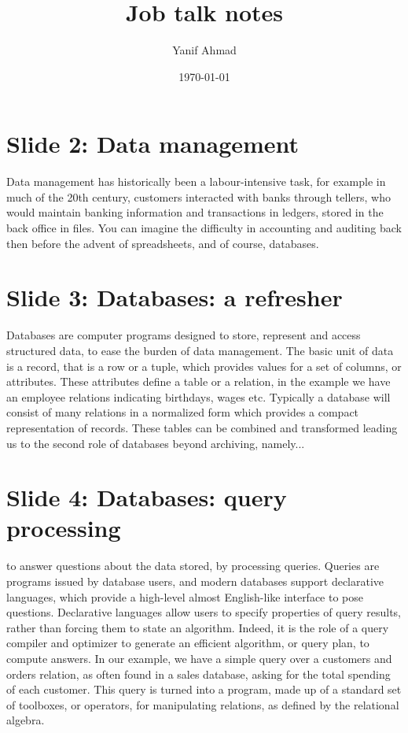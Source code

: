 \documentclass{article}
\newcommand{\comment}[1]{}
\begin{document}
\title{Job talk notes}
\author{Yanif Ahmad}
\date{\today}
\maketitle

\section{Slide 2: Data management}
Data management has historically been a labour-intensive task, for example in
much of the 20th century, customers interacted with banks through tellers, who
would maintain banking information and transactions in ledgers, stored in
the back office in files. You can imagine the difficulty in accounting and
auditing back then before the advent of spreadsheets, and of course, databases.

\section{Slide 3: Databases: a refresher}
Databases are computer programs designed to store, represent and access
structured data, to ease the burden of data management. The basic unit of data
is a record, that is a row or a tuple, which provides values for a set of
columns, or attributes. These attributes define a table or a relation, in the
example we have an employee relations indicating birthdays, wages etc.
Typically a database will consist of many relations in a normalized form which
provides a compact representation of records. These tables can be combined and
transformed leading us to the second role of databases beyond archiving, namely...

\section{Slide 4: Databases: query processing}
to answer questions about the data stored, by processing queries. Queries are
programs issued by database users, and modern databases support declarative
languages, which provide a high-level almost English-like interface to pose
questions. Declarative languages allow users to specify properties of query
results, rather than forcing them to state an algorithm. Indeed, it is the role
of a query compiler and optimizer to generate an efficient algorithm, or query
plan, to compute answers.  In our example, we have a simple query over a
customers and orders relation, as often found in a sales database, asking for
the total spending of each customer. This query is turned into a program, made
up of a standard set of toolboxes, or operators, for manipulating relations, as
defined by the relational algebra.
\comment{
For those of you familiar with databases, this algebra contains operators such
as selections, projections, unions, joins and differences.
}
\end{document}
